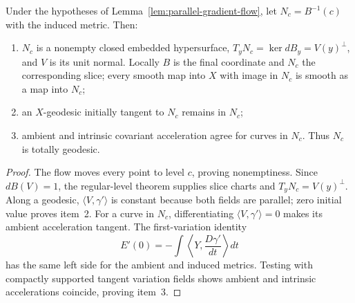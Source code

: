 \begin{lemma}
Under the hypotheses of Lemma~\ref{lem:parallel-gradient-flow}, let
$N_c=B^{-1}(c)$ with the induced metric. Then:
\begin{enumerate}
\item $N_c$ is a nonempty closed embedded hypersurface,
$T_yN_c=\ker dB_y=V(y)^\perp$, and $V$ is its unit normal. Locally
$B$ is the final coordinate and $N_c$ the corresponding slice; every
smooth map into $X$ with image in $N_c$ is smooth as a map into $N_c$;
\item an $X$-geodesic initially tangent to $N_c$ remains in $N_c$;
\item ambient and intrinsic covariant acceleration agree for curves in
$N_c$. Thus $N_c$ is totally geodesic.
\end{enumerate}
\end{lemma}
\begin{proof}
\sketch
{}
The flow moves every point to level $c$, proving nonemptiness. Since
$dB(V)=1$, the regular-level theorem supplies slice charts and
$T_yN_c=V(y)^\perp$. Along a geodesic,
$\langle V,\gamma'\rangle$ is constant because both fields are parallel;
zero initial value proves item~2. For a curve in $N_c$, differentiating
$\langle V,\gamma'\rangle=0$ makes its ambient acceleration tangent.
The first-variation identity
$$E'(0)=-\int\left\langle Y,\frac{D\gamma'}{dt}\right\rangle dt$$
has the same left side for the ambient and induced metrics. Testing with
compactly supported tangent variation fields shows ambient and intrinsic
accelerations coincide, proving item~3.
\end{proof}


